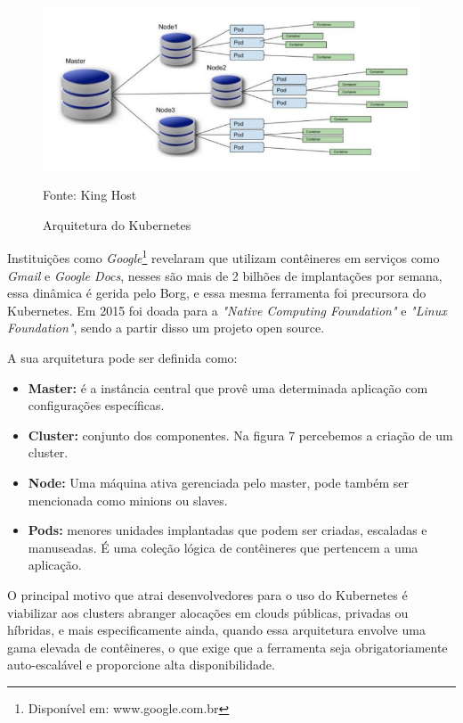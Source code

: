 \begin{figure}[htb]
	\centering
	\includegraphics[width=1\linewidth]{imagens/kubernetes}
	\caption{Arquitetura do Kubernetes}
	Fonte: King Host\footnotemark
	\label{fig:kubernetes}
\end{figure}

Instituições como \textit{Google}\footnote{Disponível em: www.google.com.br} revelaram que utilizam  contêineres em serviços como \textit{Gmail} e \textit{Google Docs}, nesses são mais de 2 bilhões de implantações por semana, essa dinâmica é gerida pelo Borg, e essa mesma ferramenta foi precursora do Kubernetes. Em 2015 foi doada para a \textit{"Native Computing Foundation"} e \textit{"Linux Foundation"}, sendo a partir disso um projeto open source.\cite{trucco}

A sua arquitetura pode ser definida como:
\begin{itemize}
\item \textbf{Master:} é a instância central que provê uma determinada aplicação com configurações específicas.
\item \textbf{Cluster: }conjunto dos componentes. Na figura 7 percebemos a criação de um cluster.
\item \textbf{Node:} Uma máquina ativa gerenciada pelo master, pode também ser mencionada como minions ou slaves.
\item \textbf{Pods:} menores unidades implantadas que podem ser criadas, escaladas e manuseadas. É uma coleção lógica de contêineres que pertencem a uma aplicação.
\end{itemize}

O principal motivo que atrai desenvolvedores para o uso do Kubernetes é viabilizar aos clusters abranger alocações em clouds públicas, privadas ou híbridas, e mais especificamente ainda, quando essa arquitetura envolve uma gama elevada de contêineres, o que exige que a ferramenta seja obrigatoriamente auto-escalável e proporcione alta disponibilidade.


